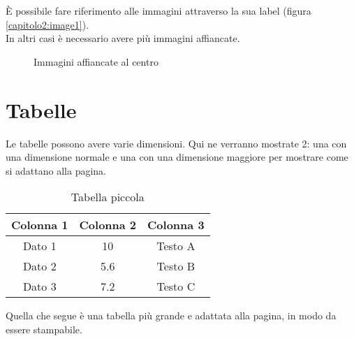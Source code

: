 È possibile fare riferimento alle immagini attraverso la sua label (figura \ref{capitolo2:image1}).\\   %
In altri casi è necessario avere più immagini affiancate.

\begin{figure}[H]
    \centering
    \hfill
    \hfill
    \hfill
    \caption{Immagini affiancate al centro}
    \label{capitolo2:immaginiAffiancate}
\end{figure}


\section{Tabelle}
Le tabelle possono avere varie dimensioni. Qui ne verranno mostrate 2: una con una dimensione normale e una con una dimensione maggiore per mostrare come si adattano alla pagina.
\begin{table}[h!]
    \centering
    \begin{tabular}{|c|c|c|}
        \hline
        \textbf{Colonna 1} & \textbf{Colonna 2} & \textbf{Colonna 3} \\
        \hline
        Dato 1 & 10 & Testo A \\
        \hline
        Dato 2 & 5.6 & Testo B \\
        \hline
        Dato 3 & 7.2 & Testo C \\
        \hline
    \end{tabular}
    \caption{Tabella piccola}
	\label{capitolo2:tabellaPiccola}
\end{table}

Quella che segue è una tabella più grande e adattata alla pagina, in modo da essere stampabile.

